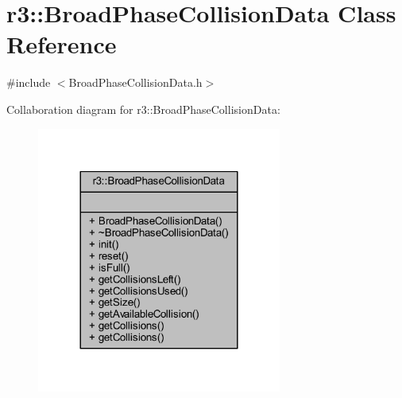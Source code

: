 \hypertarget{classr3_1_1_broad_phase_collision_data}{}\section{r3\+:\+:Broad\+Phase\+Collision\+Data Class Reference}
\label{classr3_1_1_broad_phase_collision_data}


{\ttfamily \#include $<$Broad\+Phase\+Collision\+Data.\+h$>$}



Collaboration diagram for r3\+:\+:Broad\+Phase\+Collision\+Data\+:\nopagebreak
\begin{figure}[H]
\begin{center}
\leavevmode
\includegraphics[width=228pt]{classr3_1_1_broad_phase_collision_data__coll__graph}
\end{center}
\end{figure}

